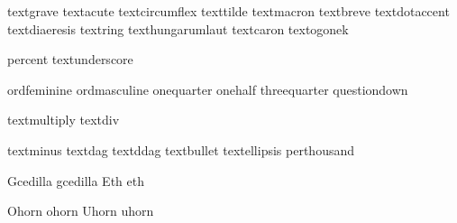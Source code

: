  textgrave        {}
 textacute        {}
 textcircumflex   {}
 texttilde        {}
 textmacron       {}
 textbreve        {}
 textdotaccent    {}
 textdiaeresis    {}
 textring         {}
 texthungarumlaut {}
 textcaron        {}
 textogonek       {}

 percent          {}
 textunderscore   {}

 ordfeminine      {}
 ordmasculine     {}
 onequarter       {}
 onehalf          {}
 threequarter     {}
 questiondown     {}

 textmultiply     {}
 textdiv          {}

 textminus        {}
 textdag          {}
 textddag         {}
 textbullet       {}
 textellipsis     {}
 perthousand      {}

 Gcedilla         {}
 gcedilla         {}
 Eth              {}
 eth              {}

\stopencoding


\startencoding[uc]

   Ohorn                {}
   ohorn                {}
   Uhorn                {}
   uhorn                {}


